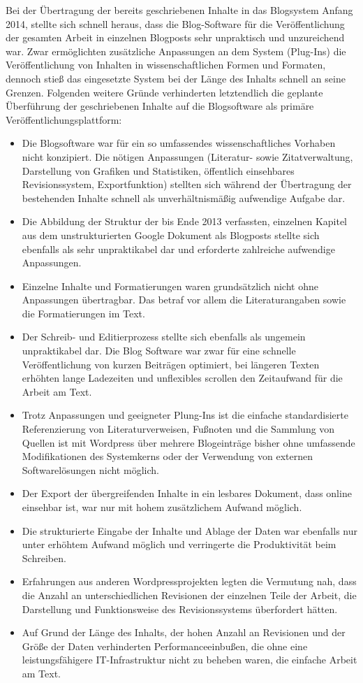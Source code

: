 Bei der Übertragung der bereits geschriebenen Inhalte in das Blogsystem Anfang 2014, stellte sich schnell heraus, dass die Blog-Software für die Veröffentlichung der gesamten Arbeit in einzelnen Blogposts sehr unpraktisch und unzureichend war. Zwar ermöglichten zusätzliche Anpassungen an dem System (Plug-Ins) die Veröffentlichung von Inhalten in wissenschaftlichen Formen und Formaten, dennoch stieß das eingesetzte System bei der Länge des Inhalts schnell an seine Grenzen. Folgenden weitere Gründe verhinderten letztendlich die geplante Überführung der geschriebenen Inhalte auf die Blogsoftware als primäre Veröffentlichungsplattform:
\begin{itemize}
\item Die Blogsoftware war für ein so umfassendes wissenschaftliches Vorhaben nicht konzipiert. Die nötigen Anpassungen (Literatur- sowie Zitatverwaltung, Darstellung von Grafiken und Statistiken, öffentlich einsehbares Revisionssystem, Exportfunktion) stellten sich während der Übertragung der bestehenden Inhalte schnell als unverhältnismäßig aufwendige Aufgabe dar.
\item Die Abbildung der Struktur der bis Ende 2013 verfassten, einzelnen Kapitel aus dem unstrukturierten Google Dokument als Blogposts stellte sich ebenfalls als sehr unpraktikabel dar und erforderte zahlreiche aufwendige Anpassungen.
\item Einzelne Inhalte und Formatierungen waren grundsätzlich nicht ohne Anpassungen übertragbar. Das betraf vor allem die Literaturangaben sowie die Formatierungen im Text.
\item Der Schreib- und Editierprozess stellte sich ebenfalls als ungemein unpraktikabel dar. Die Blog Software war zwar für eine schnelle Veröffentlichung von kurzen Beiträgen optimiert, bei längeren Texten erhöhten lange Ladezeiten und unflexibles scrollen den Zeitaufwand für die Arbeit am Text.
\item Trotz Anpassungen und geeigneter Plung-Ins ist die einfache standardisierte Referenzierung von Literaturverweisen, Fußnoten und die Sammlung von Quellen ist mit Wordpress über mehrere Blogeinträge bisher ohne umfassende Modifikationen des Systemkerns oder der Verwendung von externen Softwarelösungen nicht möglich.
\item Der Export der übergreifenden Inhalte in ein lesbares Dokument, dass online einsehbar ist, war nur mit hohem zusätzlichem Aufwand möglich.
\item Die strukturierte Eingabe der Inhalte und Ablage der Daten war ebenfalls nur unter erhöhtem Aufwand möglich und verringerte die Produktivität beim Schreiben.
\item Erfahrungen aus anderen Wordpressprojekten legten die Vermutung nah, dass die Anzahl an unterschiedlichen Revisionen der einzelnen Teile der Arbeit, die Darstellung und Funktionsweise des Revisionssystems überfordert hätten.
\item Auf Grund der Länge des Inhalts, der hohen Anzahl an Revisionen und der Größe der Daten verhinderten Performanceeinbußen, die ohne eine leistungsfähigere IT-Infrastruktur nicht zu beheben waren, die einfache Arbeit am Text.
\end{itemize}

